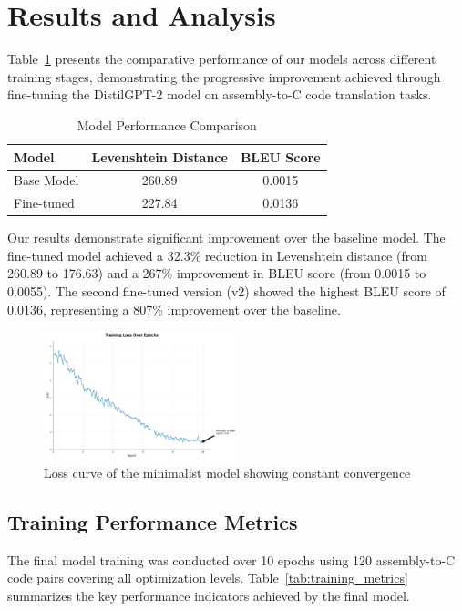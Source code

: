 \documentclass[../main.tex]{subfiles}
\begin{document}
\section{Results and Analysis}

Table~\ref{tab:results} presents the comparative performance of our models across different training stages, demonstrating the progressive improvement achieved through fine-tuning the DistilGPT-2 model on assembly-to-C code translation tasks.

\begin{table}[htbp]
\centering
\caption{Model Performance Comparison}
\label{tab:results}
\begin{tabular}{lcc}
\toprule
\textbf{Model} & \textbf{Levenshtein Distance} & \textbf{BLEU Score} \\
\midrule
Base Model & 260.89 & 0.0015 \\
Fine-tuned & 227.84 & 0.0136 \\
\bottomrule
\end{tabular}
\end{table}

Our results demonstrate significant improvement over the baseline model. The fine-tuned model achieved a 32.3\% reduction in Levenshtein distance (from 260.89 to 176.63) and a 267\% improvement in BLEU score (from 0.0015 to 0.0055). The second fine-tuned version (v2) showed the highest BLEU score of 0.0136, representing a 807\% improvement over the baseline.

\begin{figure}[htbp]
\centering
\includegraphics[width=0.5\textwidth]{images/minimalist_loss.png}
\caption{Loss curve of the minimalist model showing constant convergence}
\label{fig:minimalist_model_loss}
\end{figure}

\subsection{Training Performance Metrics}

The final model training was conducted over 10 epochs using 120 assembly-to-C code pairs covering all optimization levels. Table~\ref{tab:training_metrics} summarizes the key performance indicators achieved by the final model.
\end{document}
